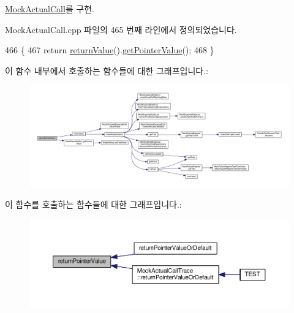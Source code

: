 \hyperlink{class_mock_actual_call_a42b79ca9f7c70b819ae78b61897b68b7}{Mock\+Actual\+Call}를 구현.



Mock\+Actual\+Call.\+cpp 파일의 465 번째 라인에서 정의되었습니다.


\begin{DoxyCode}
466 \{
467     \textcolor{keywordflow}{return} \hyperlink{class_mock_checked_actual_call_a97defb904464d58fdd3e1c8f1d937fc6}{returnValue}().\hyperlink{class_mock_named_value_a841cebf86eaad9de0cb3755466ae34be}{getPointerValue}();
468 \}
\end{DoxyCode}


이 함수 내부에서 호출하는 함수들에 대한 그래프입니다.\+:
\nopagebreak
\begin{figure}[H]
\begin{center}
\leavevmode
\includegraphics[width=350pt]{class_mock_checked_actual_call_a16396f85804380c580c6783f2fb63af2_cgraph}
\end{center}
\end{figure}




이 함수를 호출하는 함수들에 대한 그래프입니다.\+:
\nopagebreak
\begin{figure}[H]
\begin{center}
\leavevmode
\includegraphics[width=350pt]{class_mock_checked_actual_call_a16396f85804380c580c6783f2fb63af2_icgraph}
\end{center}
\end{figure}


